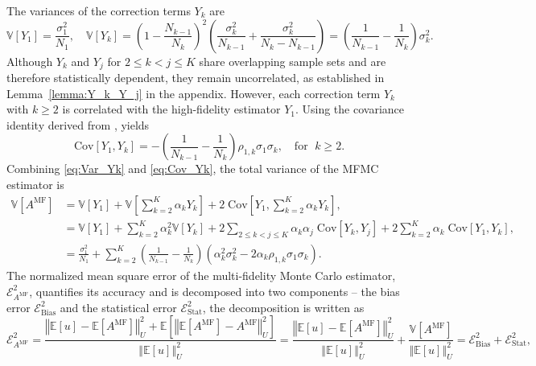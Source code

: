 The variances of the correction terms $Y_k$ are
%
\begin{equation}\label{eq:Var_Yk}
    \mathbb{V}\left[Y_1\right] = \frac{\sigma_1^2}{N_1}, \quad \mathbb{V}\left[Y_k\right] = \left(1-\frac{N_{k-1}}{N_k}\right)^2\left(\frac{\sigma_k^2}{N_{k-1}}+\frac{\sigma_k^2}{N_k-N_{k-1}}\right) = \left(\frac{1}{N_{k-1}} - \frac{1}{N_k}\right)\sigma_k^2.
\end{equation}
%
Although $Y_k$ and $Y_j$ for $2\le k<j \le K$ share overlapping sample sets and are therefore statistically dependent, they remain uncorrelated, as established in Lemma~\ref{lemma:Y_k_Y_j} in the appendix. However, each correction term $Y_k$ with $k\ge 2$ is correlated with the high-fidelity estimator $Y_1$. Using the covariance identity derived from \cite[Lemma~3.2]{PeWiGu:2016}, yields
%
\begin{equation}\label{eq:Cov_Yk}
\text{Cov}[Y_1,Y_k] = - \left(\frac{1}{N_{k-1}} - \frac{1}{N_k}\right)\rho_{1,k}\sigma_1\sigma_k, \quad \text{for } \; k\ge 2.
\end{equation}
%
Combining \eqref{eq:Var_Yk} and \eqref{eq:Cov_Yk}, the total variance of the MFMC estimator is 
%
\begin{align}
    \nonumber
    \mathbb{V}\left[A^{\text{MF}}\right] &= \mathbb{V}\left[Y_1\right] + \mathbb{V}\left[\sum_{k=2}^K \alpha_kY_k\right]+2\;\text{Cov}\left[Y_1,\sum_{k=2}^K \alpha_k Y_k \right],\\
    \nonumber
    &=\mathbb{V}\left[Y_1\right] + \sum_{k=2}^K \alpha_k^2 \mathbb{V}\left[Y_k\right]+2\sum_{2\le k<j\le K} \alpha_k\alpha_j\; \text{Cov}[Y_k,Y_j] +2\sum_{k=2}^K \alpha_k\;\text{Cov}\left[Y_1, Y_k\right],\\
    \label{eq:MFMC_variance}
    &=\frac{\sigma_1^2}{N_1} + \sum_{k=2}^K \left(\frac{1}{N_{k-1}} - \frac{1}{N_k}\right)\left(\alpha_k^2\sigma_k^2 - 2\alpha_k\rho_{1,k}\sigma_1\sigma_k\right).
\end{align}
%
The normalized mean square error of the multi-fidelity Monte Carlo estimator, $\mathcal{E}_{A^{\text{MF}}}^2$, quantifies its accuracy and is decomposed into two components -- the bias error $\mathcal{E}_{\text{Bias}}^2$ and the statistical error $\mathcal{E}_{\text{Stat}}^2$, the decomposition is written as 
%
\[
\mathcal{E}_{A^{\text{MF}}}^2= \frac{\left\Vert\mathbb{E}[u]-\mathbb{E}\left[A^{\text{MF}}\right] \right\Vert_{U}^2+\mathbb E\left[\left\Vert\mathbb{E}\left[A^{\text{MF}}\right]-A^{\text{MF}} \right\Vert_{U}^2\right]}{\left\Vert\mathbb{E}[u] \right\Vert_{U}^2} =\frac{\left\Vert\mathbb{E}[u]-\mathbb{E}\left[A^{\text{MF}}\right] \right\Vert_{U}^2}{\left\Vert\mathbb{E}[u] \right\Vert_{U}^2}+ \frac{\mathbb{V}\left[A^{\text{MF}}\right]}{\left\Vert\mathbb{E}[u] \right\Vert_{U}^2}=\mathcal{E}_{\text{Bias}}^2 + \mathcal{E}_{\text{Stat}}^2,
\]
